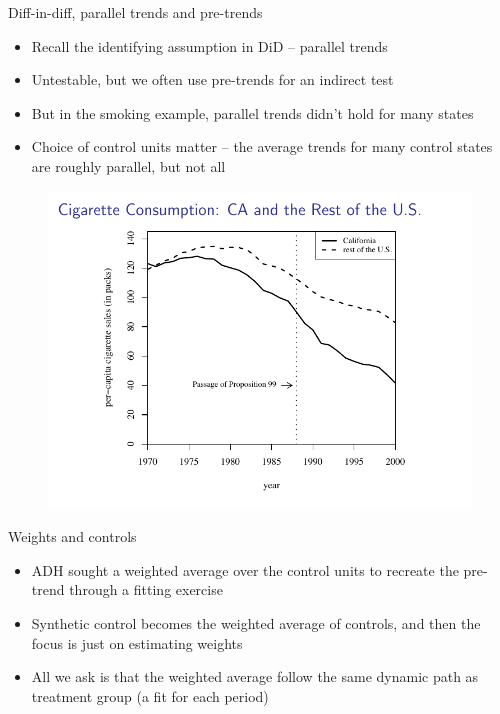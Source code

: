 \documentclass{beamer}
\begin{document}
\begin{frame}{Diff-in-diff, parallel trends and pre-trends}

\begin{itemize}
\item Recall the identifying assumption in DiD -- parallel trends
\item Untestable, but we often use pre-trends for an indirect test
\item But in the smoking example, parallel trends didn't hold for many states
\item Choice of control units matter -- the average trends for many control states are roughly parallel, but not all 
\end{itemize}

	
	\begin{figure}
	\includegraphics[scale=0.65]{./lecture_includes/abadie_3.pdf}
	\end{figure}


\end{frame}

\begin{frame}{Weights and controls}

\begin{itemize}
\item ADH sought a weighted average over the control units to recreate the pre-trend through a fitting exercise
\item Synthetic control becomes the weighted average of controls, and then the focus is just on estimating weights
\item All we ask is that the weighted average follow the same dynamic path as treatment group (a fit for each period)

\end{itemize}

\end{frame}
\end{document}
